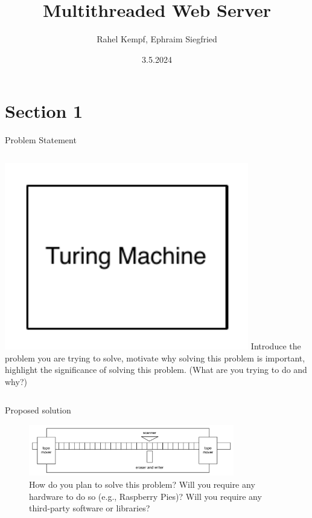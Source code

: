 \documentclass[aspectratio=169]{beamer}
\title              {Multithreaded Web Server}
\author             {Rahel Kempf, Ephraim Siegfried}
\institute          {Operating Systems, University of Basel}
\date               {3.5.2024}
\begin{document}
\begin{frame}[t,plain]
\titlepage
\end{frame}


\section{Section 1}	%

\begin{frame}[c]{Problem Statement}
\begin{columns}[c]
            \includegraphics[width=0.8\textwidth]{block}
Introduce the problem you are trying to solve,
motivate why solving this problem is important, highlight the
significance of solving this problem. (What are you trying to do and
why?)
\end{columns}
\end{frame}


\begin{frame}[c]{Proposed solution}
    \begin{figure}
        \includegraphics[width=0.8\textwidth]{turingmachine}
        \caption{How do you plan to solve this problem? Will you
require any hardware to do so (e.g., Raspberry Pies)? Will you require
any third-party software or libraries?}
    \end{figure}
\end{frame}
\end{document}
